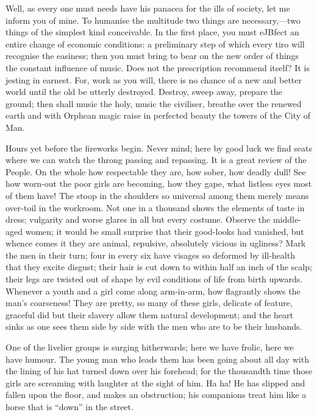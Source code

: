 Well, as every one must needs have his panacea for the ills of society,
let me inform you of mine. To humanise the multitude two things are
necessary,---two things of the simplest kind conceivable. In the first
place, you must eJBfect an entire change of economic conditions: a
preliminary step of which every tiro will recognise the easiness; then
you {\protect\hypertarget{265}{}{}}must bring to bear on the new order
of things the constant influence of music. Does not the prescription
recommend itself? It is jesting in earnest. For, work as you will, there
is no chance of a new and better world until the old be utterly
destroyed. Destroy, sweep away, prepare the ground; then shall music the
holy, music the civiliser, breathe over the renewed earth and with
Orphean magic raise in perfected beauty the towers of the City of Man.

Hours yet before the fireworks begin. Never mind; here by good luck we
find seats where we can watch the throng passing and repassing. It is a
great review of the People. On the whole how respectable they are, how
sober, how deadly dull! See how worn-out the poor girls are becoming,
how they gape, what listless eyes most of them have! The stoop in the
shoulders so universal among them merely means over-toil in the
workroom. Not one in a thousand shows the elements of taste in dress;
vulgarity and worse glares in all but every costume. Observe the
{\protect\hypertarget{266}{}{}}middle-aged women; it would be small
surprise that their good-looks had vanished, but whence comes it they
are animal, repulsive, absolutely vicious in ugliness? Mark the men in
their turn; four in every six have visages so deformed by ill-health
that they excite disgust; their hair is cut down to within half an inch
of the scalp; their legs are twisted out of shape by evil conditions of
life from birth upwards. Whenever a youth and a girl come along
arm-in-arm, how flagrantly shows the man's coarseness! They are pretty,
so many of these girls, delicate of feature, graceful did but their
slavery allow them natural development; and the heart sinks as one sees
them side by side with the men who are to be their husbands.

One of the livelier groups is surging hitherwards; here we have frolic,
here we have humour. The young man who leads them has been going about
all day with the lining of his hat turned down over his forehead; for
the thousandth time those girls are screaming with laughter at the sight
of him. Ha ha! {\protect\hypertarget{267}{}{}}He has slipped and fallen
upon the floor, and makes an obstruction; his companions treat him like
a horse that is ``down'' in the street.

